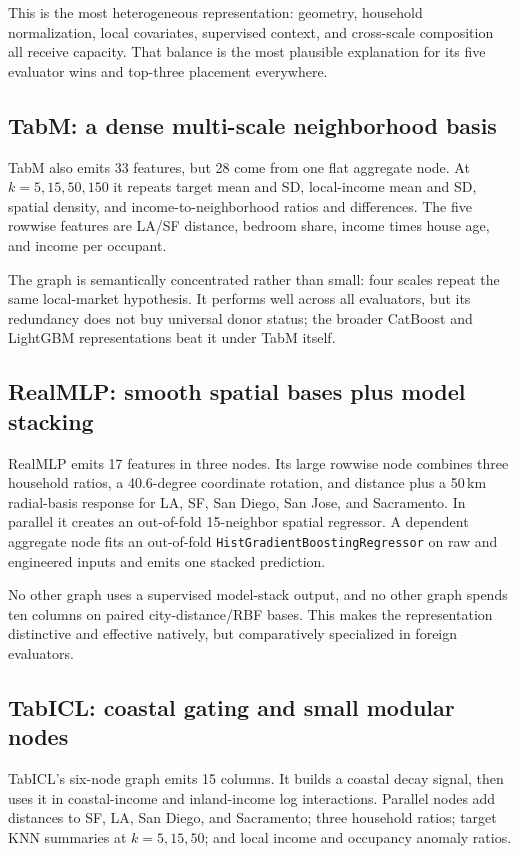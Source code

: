 \documentclass[10pt]{article}
\newcommand{\code}[1]{\texttt{#1}}
\begin{document}
This is the most heterogeneous representation: geometry, household
normalization, local covariates, supervised context, and cross-scale
composition all receive capacity.  That balance is the most plausible
explanation for its five evaluator wins and top-three placement everywhere.

\subsection{TabM: a dense multi-scale neighborhood basis}

TabM also emits 33 features, but 28 come from one flat aggregate node.  At
\(k=5,15,50,150\) it repeats target mean and SD, local-income mean and SD,
spatial density, and income-to-neighborhood ratios and differences.  The five
rowwise features are LA/SF distance, bedroom share, income times house age,
and income per occupant.

The graph is semantically concentrated rather than small: four scales repeat
the same local-market hypothesis.  It performs well across all evaluators,
but its redundancy does not buy universal donor status; the broader CatBoost
and LightGBM representations beat it under TabM itself.

\subsection{RealMLP: smooth spatial bases plus model stacking}

RealMLP emits 17 features in three nodes.  Its large rowwise node combines
three household ratios, a 40.6-degree coordinate rotation, and distance plus a
50\,km radial-basis response for LA, SF, San Diego, San Jose, and Sacramento.
In parallel it creates an out-of-fold 15-neighbor spatial regressor.  A
dependent aggregate node fits an out-of-fold
\code{HistGradientBoostingRegressor} on raw and engineered inputs and emits
one stacked prediction.

No other graph uses a supervised model-stack output, and no other graph spends
ten columns on paired city-distance/RBF bases.  This makes the representation
distinctive and effective natively, but comparatively specialized in foreign
evaluators.

\subsection{TabICL: coastal gating and small modular nodes}

TabICL's six-node graph emits 15 columns.  It builds a coastal decay signal,
then uses it in coastal-income and inland-income log interactions.  Parallel
nodes add distances to SF, LA, San Diego, and Sacramento; three household
ratios; target KNN summaries at \(k=5,15,50\); and local income and occupancy
anomaly ratios.
\end{document}
